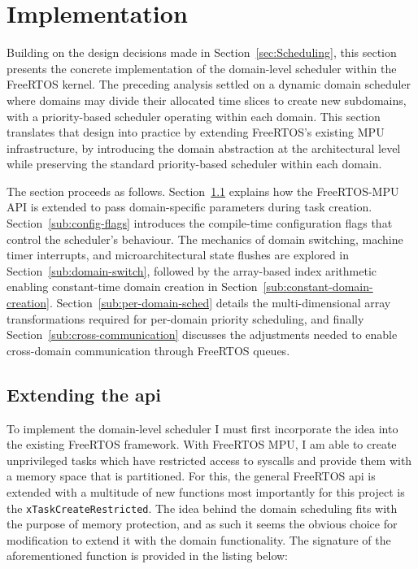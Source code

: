 \section{Implementation}\label{sec:Implementation}
Building on the design decisions made in Section~\ref{sec:Scheduling}, this
section presents the concrete implementation of the domain-level scheduler
within the FreeRTOS kernel. The preceding analysis settled on a dynamic domain
scheduler where domains may divide their allocated time slices to create new
subdomains, with a priority-based scheduler operating within each domain. This
section translates that design into practice by extending FreeRTOS's existing
MPU infrastructure, by introducing the domain abstraction at the architectural
level while preserving the standard priority-based scheduler within each
domain.

The section proceeds as follows. Section~\ref{sub:api} explains how the
FreeRTOS-MPU API is extended to pass domain-specific parameters during task
creation. Section~\ref{sub:config-flags} introduces the compile-time
configuration flags that control the scheduler's behaviour. The mechanics of
domain switching, machine timer interrupts, and microarchitectural state
flushes are explored in Section~\ref{sub:domain-switch}, followed by the
array-based index arithmetic enabling constant-time domain creation in
Section~\ref{sub:constant-domain-creation}. Section~\ref{sub:per-domain-sched}
details the multi-dimensional array transformations required for per-domain
priority scheduling, and finally Section~\ref{sub:cross-communication}
discusses the adjustments needed to enable cross-domain communication through
FreeRTOS queues.

\subsection{Extending the api}\label{sub:api}
To implement the domain-level scheduler I must first incorporate the idea into
the existing FreeRTOS framework. With FreeRTOS MPU, I am able to create
unprivileged tasks which have restricted access to syscalls and provide them
with a memory space that is partitioned. For this, the general FreeRTOS api is
extended with a multitude of new functions most importantly for this project is
the \texttt{xTaskCreateRestricted}\cite{MemoryProtectionUnit2026}. The idea
behind the domain scheduling fits with the purpose of memory protection, and as
such it seems the obvious choice for modification to extend it with the domain
functionality. The signature of the aforementioned function is provided in the
listing below:

